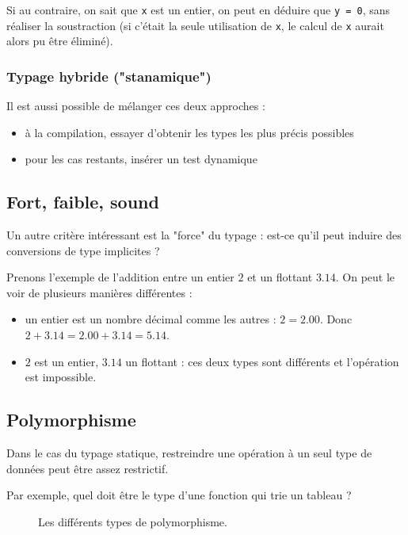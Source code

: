 Si au contraire, on sait que \texttt{x} est un entier, on peut en déduire que
\texttt{y = 0}, sans réaliser la soustraction (si c'était la seule utilisation
de \texttt{x}, le calcul de \texttt{x} aurait alors pu être éliminé).

\subsubsection{Typage hybride ("stanamique")}

Il est aussi possible de mélanger ces deux approches :

\begin{itemize}
\item
  à la compilation, essayer d'obtenir les types les plus précis
  possibles
\item
  pour les cas restants, insérer un test dynamique
\end{itemize}

\subsection{Fort, faible, sound}

Un autre critère intéressant est la "force" du typage : est-ce qu'il peut
induire des conversions de type implicites ?

Prenons l'exemple de l'addition entre un entier $2$ et un flottant $3.14$. On
peut le voir de plusieurs manières différentes :

\begin{itemize}
\item
  un entier est un nombre décimal comme les autres : $2 = 2.00$. Donc
  $2 + 3.14 = 2.00 + 3.14 = 5.14$.
\item
  $2$ est un entier, $3.14$ un flottant : ces deux types sont différents et
  l'opération est impossible.
\end{itemize}

\subsection{Polymorphisme}

Dans le cas du typage statique, restreindre une opération à un seul type de
données peut être assez restrictif.

Par exemple, quel doit être le type d'une fonction qui trie un tableau ?

\begin{figure}
\centering

\caption{Les différents types de polymorphisme.}
\label{fig:types-de-polymorphisme}
\end{figure}

